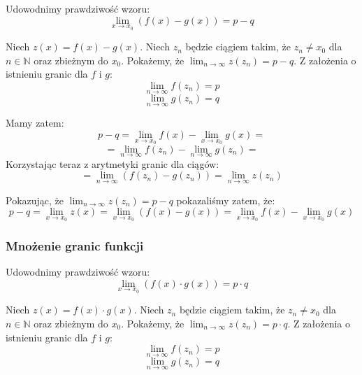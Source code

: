 \documentclass{article}
\begin{document}
Udowodnimy prawdziwość wzoru:
\begin{equation*}
    \lim_{x \to x_0}(f(x) - g(x)) = p - q
\end{equation*}

Niech \(z(x) = f(x) - g(x)\). Niech \(z_n\) będzie ciągiem takim, że \(z_n \neq x_0\) dla \(n \in \mathbb{N}\) oraz zbieżnym do \(x_0\).
Pokażemy, że \(\lim_{n \to \infty} z(z_n) = p - q\). Z założenia o istnieniu granic dla \(f\) i \(g\):
\begin{equation*}
    \lim_{n \to \infty} f(z_n) = p
\end{equation*}
\begin{equation*}
    \lim_{n \to \infty} g(z_n) = q
\end{equation*}

Mamy zatem:
\begin{equation*}
    p - q = \lim_{x \to x_0} f(x) - \lim_{x \to x_0} g(x) = 
\end{equation*}
\begin{equation*}
    = \lim_{n \to \infty} f(z_n) - \lim_{n \to \infty} g(z_n) =
\end{equation*}
Korzystając teraz z arytmetyki granic dla ciągów:
\begin{equation*}
    = \lim_{n \to \infty} (f(z_n) - g(z_n)) = \lim_{n \to \infty} z(z_n)
\end{equation*}

Pokazując, że \(\lim_{n \to \infty} z(z_n) = p - q\) pokazaliśmy zatem, że:
\begin{equation*}
    p - q = \lim_{x \to x_0} z(x) = \lim_{x \to x_0} (f(x) - g(x)) = \lim_{x \to x_0} f(x) - \lim_{x \to x_0} g(x)
\end{equation*}

\subsubsection{Mnożenie granic funkcji}

Udowodnimy prawdziwość wzoru: 
\begin{equation*}
    \lim_{x \to x_0}(f(x) \cdot g(x)) = p \cdot q
\end{equation*}

Niech \(z(x) = f(x) \cdot g(x)\). Niech \(z_n\) będzie ciągiem takim, że \(z_n \neq x_0\) dla \(n \in \mathbb{N}\) oraz zbieżnym do \(x_0\).
Pokażemy, że \(\lim_{n \to \infty} z(z_n) = p \cdot q\). Z założenia o istnieniu granic dla \(f\) i \(g\):
\begin{equation*}
    \lim_{n \to \infty} f(z_n) = p
\end{equation*}
\begin{equation*}
    \lim_{n \to \infty} g(z_n) = q
\end{equation*}
\end{document}

